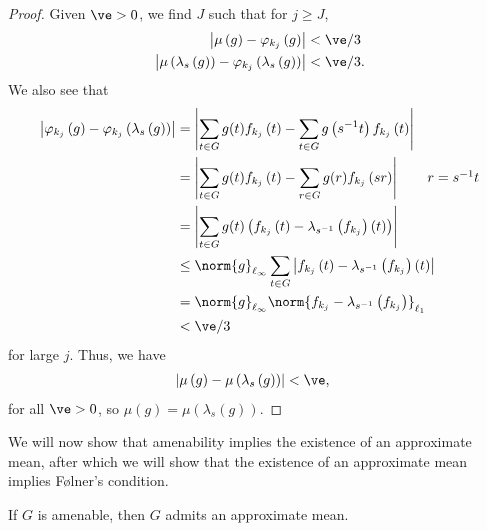 \documentclass[10pt]{mypackage2}
\begin{document}
\begin{proof}
  Given $\ve > 0$, we find $J$ such that for $j\geq J$,
  \begin{align*}
    \left\vert \mu\left(g\right) - \varphi_{k_j}\left(g\right) \right\vert &< \ve/3\\
    \left\vert \mu\left(\lambda_s\left(g\right)\right) - \varphi_{k_j}\left(\lambda_s\left(g\right)\right)\right\vert &< \ve/3.
  \end{align*}
  We also see that
  \begin{align*}
    \left\vert \varphi_{k_j}\left(g\right) - \varphi_{k_j}\left(\lambda_s\left(g\right)\right) \right\vert &= \left\vert \sum_{t\in G}g(t)f_{k_j}\left(t\right) - \sum_{t\in G}g\left(s^{-1}t\right)f_{k_j}\left(t\right) \right\vert\\
                                                                                                           &= \left\vert \sum_{t\in G}g(t)f_{k_j}\left(t\right) - \sum_{r\in G}g(r)f_{k_j}\left(sr\right) \right\vert \tag*{$r = s^{-1}t$}\\
                                                                                                           &= \left\vert \sum_{t\in G}g(t)\left(f_{k_j}\left(t\right)-\lambda_{s^{-1}}\left(f_{k_j}\right)\left(t\right)\right) \right\vert\\
                                                                                                           &\leq \norm{g}_{\ell_\infty}\sum_{t\in G}\left\vert f_{k_j}\left(t\right) - \lambda_{s^{-1}}\left(f_{k_j}\right)\left(t\right) \right\vert\\
                                                                                                           &= \norm{g}_{\ell_\infty}\norm{f_{k_j} - \lambda_{s^{-1}}\left(f_{k_j}\right)}_{\ell_1}\\
                                                                                                           &< \ve/3
  \end{align*}
  for large $j$. Thus, we have
  \begin{align*}
    \left\vert \mu\left(g\right) - \mu\left(\lambda_{s}\left(g\right)\right) \right\vert &< \ve,
  \end{align*}
  for all $\ve > 0$, so $\mu\left(g\right) = \mu\left(\lambda_{s}\left(g\right)\right)$.
\end{proof}
We will now show that amenability implies the existence of an approximate mean, after which we will show that the existence of an approximate mean implies Følner's condition.
\begin{proposition}\label{prop:amenable_implies_approx_mean}
  If $G$ is amenable, then $G$ admits an approximate mean.
\end{proposition}
\end{document}
